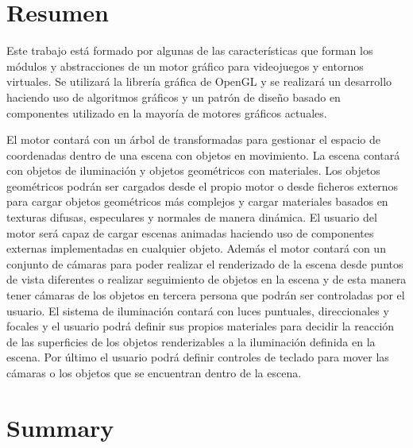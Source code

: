 \documentclass[a4paper, 17pt]{book}
\begin{document}
\chapter*{Resumen}

Este trabajo está formado por algunas de las características que forman los módulos 
y abstracciones de un motor gráfico para videojuegos y entornos virtuales. Se utilizará 
la librería gráfica de OpenGL y se realizará un desarrollo haciendo uso de algoritmos 
gráficos y un patrón de diseño basado en componentes utilizado en la mayoría de motores
gráficos actuales. 

\vspace{1mm} %

El motor contará con un árbol de transformadas para gestionar el espacio de coordenadas 
dentro de una escena con objetos en movimiento. La escena contará con objetos de iluminación 
y objetos geométricos con materiales. Los objetos geométricos podrán ser cargados desde el 
propio motor o desde ficheros externos para cargar objetos geométricos más complejos y 
cargar materiales basados en texturas difusas, especulares y normales de manera dinámica. 
El usuario del motor será capaz de cargar escenas animadas haciendo uso de componentes 
externas implementadas en cualquier objeto. Además el motor contará con un conjunto de 
cámaras para poder realizar el renderizado de la escena desde puntos de vista diferentes 
o realizar seguimiento de objetos en la escena y de esta manera tener cámaras de los 
objetos en tercera persona que podrán ser controladas por el usuario. El sistema de 
iluminación contará con luces puntuales, direccionales y focales y el usuario podrá 
definir sus propios materiales para decidir la reacción de las superficies de los 
objetos renderizables a la iluminación definida en la escena. Por último el usuario 
podrá definir controles de teclado para mover las cámaras o los objetos que se encuentran 
dentro de la escena.


\chapter*{Summary}
\end{document}
